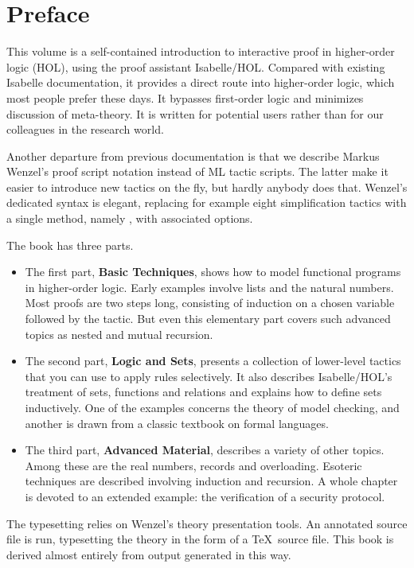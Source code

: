 \chapter*{Preface}

This volume is a self-contained introduction to interactive proof
in higher-order logic (HOL), using the proof assistant Isabelle/HOL\@. 
Compared with existing Isabelle documentation,
it provides a direct route into higher-order logic, which most people
prefer these days. It bypasses first-order logic and minimizes
discussion of meta-theory.  It is written for potential users rather
than for our colleagues in the research world.

%
Another departure from previous documentation is that we describe Markus
Wenzel's proof script notation instead of ML tactic scripts.  The latter
make it easier to introduce new tactics on the fly, but hardly anybody
does that.  Wenzel's dedicated syntax is elegant, replacing for example
eight simplification tactics with a single method, namely ,
with associated options.

The book has three parts.  
\begin{itemize}
\item 
The first part, \textbf{Basic Techniques},
shows how to model functional programs in higher-order logic.  Early
examples involve lists and the natural numbers.  Most proofs
are two steps long, consisting of induction on a chosen variable
followed by the  tactic.  But even this elementary part
covers such advanced topics as nested and mutual recursion.
\item 
The second part, \textbf{Logic and Sets}, presents a collection of
lower-level tactics that you can use to apply rules selectively.  It
also describes Isabelle/HOL's treatment of sets, functions and
relations and explains how to define sets inductively.  One of the
examples concerns the theory of model checking, and another is drawn
from a classic textbook on formal languages.
\item 
The third part, \textbf{Advanced Material}, describes a variety of
other topics.  Among these are the real numbers, records and
overloading.  Esoteric techniques are described involving induction and
recursion.  A whole chapter is devoted to an extended example: the
verification of a security protocol.
\end{itemize}

The typesetting relies on Wenzel's theory presentation tools.  An
annotated source file is run, typesetting the theory
in the form of a \TeX\ source file.  This book is
derived almost entirely from output generated in this way.

